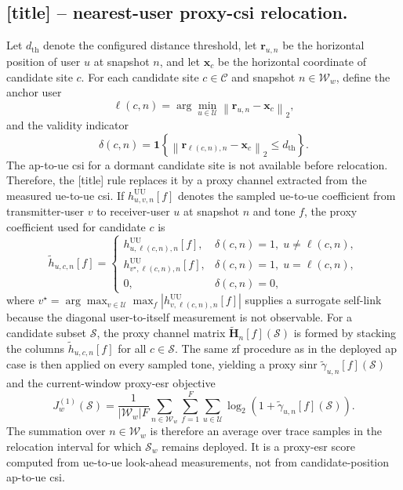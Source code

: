 \subsection{\texorpdfstring{[title] -- nearest-user proxy-\gls{csi} relocation.}{Distributed movable proxy-CSI relocation.}}
Let $d_{\mathrm{th}}$ denote the configured distance threshold, let $\mathbf{r}_{u,n}$ be the horizontal position of user $u$ at snapshot $n$, and let $\mathbf{x}_c$ be the horizontal coordinate of candidate site $c$. For each candidate site $c \in \mathcal{C}$ and snapshot $n \in \mathcal{W}_w$, define the anchor user
\begin{equation}
    \ell(c,n)=
    \arg\min_{u \in \mathcal{U}}
    \left\|\mathbf{r}_{u,n}-\mathbf{x}_c\right\|_2,
\end{equation}
and the validity indicator
\begin{equation}
    \delta(c,n)=
    \mathbf{1}\!\left\{
        \left\|\mathbf{r}_{\ell(c,n),n}-\mathbf{x}_c\right\|_2 \le d_{\mathrm{th}}
    \right\}.
\end{equation}
The \gls{ap}-to-\gls{ue} \gls{csi} for a dormant candidate site is not available before relocation. Therefore, the [title] rule replaces it by a proxy channel extracted from the measured \gls{ue}-to-\gls{ue} \gls{csi}. If $h^{\mathrm{UU}}_{u,v,n}[f]$ denotes the sampled \gls{ue}-to-\gls{ue} coefficient from transmitter-user $v$ to receiver-user $u$ at snapshot $n$ and tone $f$, the proxy coefficient used for candidate $c$ is
\begin{equation}
    \tilde{h}_{u,c,n}[f]=
    \begin{cases}
        h^{\mathrm{UU}}_{u,\ell(c,n),n}[f], & \delta(c,n)=1,\; u \neq \ell(c,n), \\
        h^{\mathrm{UU}}_{v^\star,\ell(c,n),n}[f], & \delta(c,n)=1,\; u = \ell(c,n), \\
        0, & \delta(c,n)=0,
    \end{cases}
\end{equation}
where $v^\star=\arg\max_{v \in \mathcal{U}} \max_f |h^{\mathrm{UU}}_{v,\ell(c,n),n}[f]|$ supplies a surrogate self-link because the diagonal user-to-itself measurement is not observable. For a candidate subset $\mathcal{S}$, the proxy channel matrix $\tilde{\mathbf{H}}_n[f](\mathcal{S})$ is formed by stacking the columns $\tilde{h}_{u,c,n}[f]$ for all $c \in \mathcal{S}$. The same \gls{zf} procedure as in the deployed \gls{ap} case is then applied on every sampled tone, yielding a proxy \gls{sinr} $\tilde{\gamma}_{u,n}[f](\mathcal{S})$ and the current-window proxy-\gls{esr} objective
\begin{equation}
    J_w^{(1)}(\mathcal{S}) =
    \frac{1}{|\mathcal{W}_w|F}
    \sum_{n \in \mathcal{W}_w}
    \sum_{f=1}^{F}
    \sum_{u \in \mathcal{U}}
    \log_2\!\left(1+\tilde{\gamma}_{u,n}[f](\mathcal{S})\right).
\end{equation}
The summation over $n \in \mathcal{W}_w$ is therefore an average over trace samples in the relocation interval for which $\mathcal{S}_w$ remains deployed. It is a proxy-\gls{esr} score computed from \gls{ue}-to-\gls{ue} look-ahead measurements, not from candidate-position \gls{ap}-to-\gls{ue} \gls{csi}.

